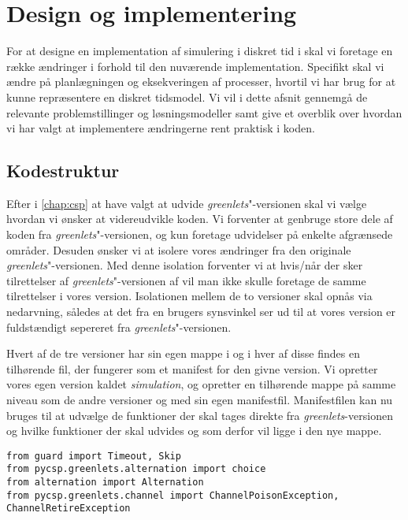 
\section{Design og implementering}
For at designe en implementation af simulering i diskret tid i \pycsp skal vi foretage en række ændringer i forhold til den nuværende implementation. Specifikt skal vi ændre på planlægningen og eksekveringen af processer, hvortil vi har brug for at kunne repræsentere en diskret tidsmodel. Vi vil i dette afsnit gennemgå de relevante problemstillinger og løsningsmodeller samt give et overblik over hvordan vi har valgt at implementere ændringerne rent praktisk i koden. 


\subsection{Kodestruktur}  
Efter i \cref{chap:csp} at have valgt at udvide \emph{greenlets}"-versionen skal vi vælge hvordan vi ønsker at videreudvikle koden. Vi forventer at genbruge store dele af koden fra \emph{greenlets}"-versionen, og kun foretage udvidelser på enkelte afgrænsede områder. Desuden ønsker vi at isolere vores ændringer fra den originale \emph{greenlets}"-versionen. Med denne isolation forventer vi at hvis/når der sker tilrettelser af \emph{greenlets}"-versionen af \pycsp vil man ikke skulle foretage de samme tilrettelser i vores version. 
Isolationen mellem de to versioner skal opnås via nedarvning, således at det fra en brugers synsvinkel ser ud til at vores version er fuldstændigt sepereret fra \emph{greenlets}"-versionen.

Hvert af de tre versioner har sin egen mappe i \pycsp og i hver af disse findes en tilhørende  fil, der fungerer som et manifest for den givne version. Vi opretter vores egen version kaldet \emph{simulation}, og opretter en tilhørende mappe på samme niveau som de andre versioner og med sin egen manifestfil. Manifestfilen kan nu bruges til at udvælge de funktioner der skal tages direkte fra \emph{greenlets}-versionen og hvilke funktioner der skal udvides og som derfor vil ligge i den nye mappe.

\begin{lstlisting}[float=hbtp,label=fig:init,caption=Uddrag af \code{\_\_init\_\_.py} for simulationsversionen.]
from guard import Timeout, Skip
from pycsp.greenlets.alternation import choice
from alternation import Alternation
from pycsp.greenlets.channel import ChannelPoisonException, ChannelRetireException
\end{lstlisting}

